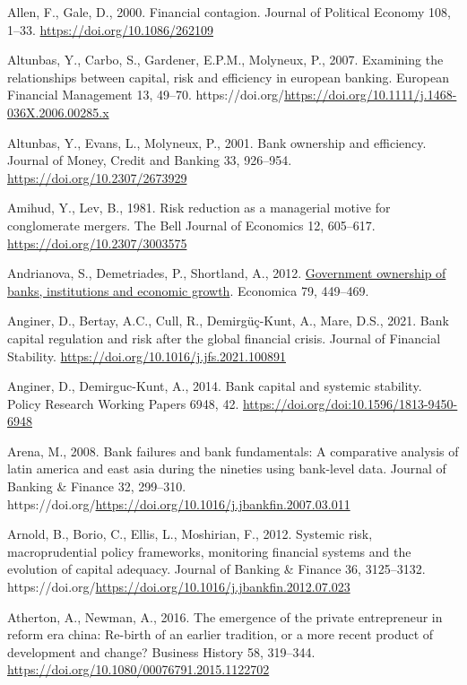 \documentclass[
  12pt,
  a4paper,
  DIV=11,
  numbers=noendperiod]{scrreprt}
\newlength{\cslhangindent}
\newenvironment{CSLReferences}[2] %
 {\begin{list}{}{%
  \setlength{\itemindent}{0pt}
  \setlength{\leftmargin}{0pt}
  \setlength{\parsep}{0pt}
  \ifodd #1
   \setlength{\leftmargin}{\cslhangindent}
   \setlength{\itemindent}{-1\cslhangindent}
  \fi
  \setlength{\itemsep}{#2\baselineskip}}}
 {\end{list}}
\begin{document}
\begin{CSLReferences}{1}{0}
Allen, F., Gale, D., 2000. Financial contagion. Journal of Political
Economy 108, 1--33. \url{https://doi.org/10.1086/262109}

Altunbas, Y., Carbo, S., Gardener, E.P.M., Molyneux, P., 2007. Examining
the relationships between capital, risk and efficiency in european
banking. European Financial Management 13, 49--70.
https://doi.org/\url{https://doi.org/10.1111/j.1468-036X.2006.00285.x}

Altunbas, Y., Evans, L., Molyneux, P., 2001. Bank ownership and
efficiency. Journal of Money, Credit and Banking 33, 926--954.
\url{https://doi.org/10.2307/2673929}

Amihud, Y., Lev, B., 1981. Risk reduction as a managerial motive for
conglomerate mergers. The Bell Journal of Economics 12, 605--617.
\url{https://doi.org/10.2307/3003575}

Andrianova, S., Demetriades, P., Shortland, A., 2012.
\href{http://www.jstor.org/stable/23274805}{Government ownership of
banks, institutions and economic growth}. Economica 79, 449--469.

Anginer, D., Bertay, A.C., Cull, R., Demirgüç-Kunt, A., Mare, D.S.,
2021. Bank capital regulation and risk after the global financial
crisis. Journal of Financial Stability.
\url{https://doi.org/10.1016/j.jfs.2021.100891}

Anginer, D., Demirguc-Kunt, A., 2014. Bank capital and systemic
stability. Policy Research Working Papers 6948, 42.
\url{https://doi.org/doi:10.1596/1813-9450-6948}

Arena, M., 2008. Bank failures and bank fundamentals: A comparative
analysis of latin america and east asia during the nineties using
bank-level data. Journal of Banking \& Finance 32, 299--310.
https://doi.org/\url{https://doi.org/10.1016/j.jbankfin.2007.03.011}

Arnold, B., Borio, C., Ellis, L., Moshirian, F., 2012. Systemic risk,
macroprudential policy frameworks, monitoring financial systems and the
evolution of capital adequacy. Journal of Banking \& Finance 36,
3125--3132.
https://doi.org/\url{https://doi.org/10.1016/j.jbankfin.2012.07.023}

Atherton, A., Newman, A., 2016. The emergence of the private
entrepreneur in reform era china: Re-birth of an earlier tradition, or a
more recent product of development and change? Business History 58,
319--344. \url{https://doi.org/10.1080/00076791.2015.1122702}


\end{CSLReferences}
\end{document}
